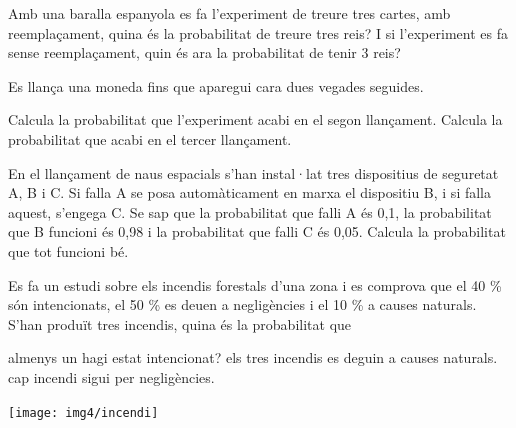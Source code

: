 \begin{mylist}
 \exer Amb una baralla espanyola es fa l'experiment de treure tres cartes, amb reemplaçament, quina és la probabilitat de treure tres reis? I si l'experiment es fa sense reemplaçament, quin és ara la probabilitat de tenir 3 reis? 
 
 \answers[cols=1]{[Amb reemplaçament $P(RRR)=\frac{4}{40}\cdot \frac{4}{40} \cdot \frac{4}{40} =\frac{1}{1000}=0.001$,
 	Sense reemplaçament $P(RRR)=\frac{4}{40}\cdot \frac{3}{39} \cdot \frac{2}{38} =\frac{1}{2470}=0.0004$]}
 
 \newpage
\exer  Es llança una moneda fins que aparegui cara dues vegades seguides. 

\begin{tasks}
	\task  Calcula la probabilitat que l'experiment acabi en el segon llançament.
	\task  Calcula la probabilitat que acabi en el tercer llançament.
\end{tasks}
\answers[cols=1]{[$P(CC)=\frac{1}{4}$, $P(XCC)=\frac{1}{8}$]}
 

\exer[1]  En el llançament de naus espacials s'han instal·lat tres dispositius de seguretat A, B i C. Si falla A se posa automàticament en marxa el dispositiu B, i si falla aquest, s'engega C. Se sap que la probabilitat que falli A és 0,1, la probabilitat que B funcioni és 0,98 i la probabilitat que falli C és 0,05. Calcula la probabilitat que tot funcioni bé. 
  

 \exer Es fa un estudi sobre els incendis forestals d'una zona i es comprova que el 40 \% són intencionats, el 50 \% es deuen a negligències i el 10 \% a causes naturals. S'han produït tres incendis,  quina és la probabilitat que

 
 \begin{minipage}{0.8\textwidth}
	\begin{tasks}
		\task  almenys un hagi estat intencionat?
		\task  els tres incendis es deguin a causes naturals.
		\task  cap incendi sigui per negligències.
	\end{tasks}
\end{minipage}
\begin{minipage}{0.15\textwidth}
	\centering
	\texttt{[image: img4/incendi]}
\end{minipage}



\end{mylist}
